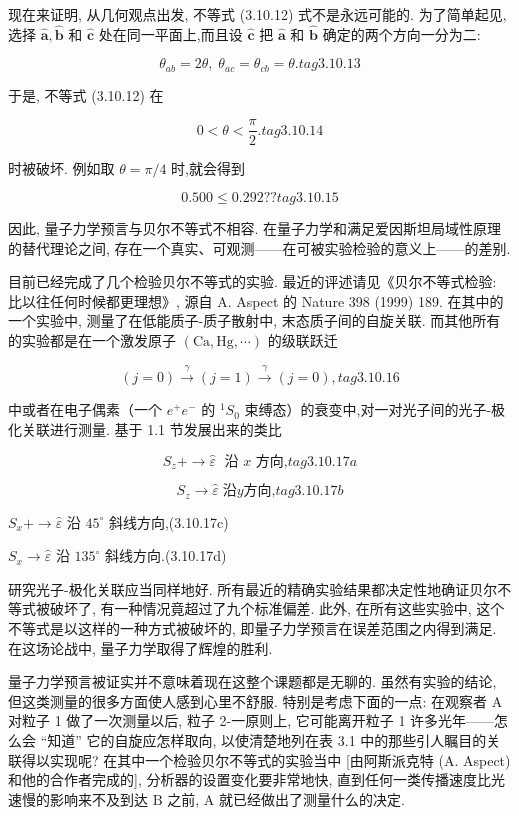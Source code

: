 现在来证明, 从几何观点出发, 不等式 (3.10.12) 式不是永远可能的. 为了简单起见, 选择 $\widehat{\mathbf{a}},\widehat{\mathbf{b}}$ 和 $\widehat{\mathbf{c}}$ 处在同一平面上,而且设 $\widehat{\mathbf{c}}$ 把 $\widehat{\mathbf{a}}$ 和 $\widehat{\mathbf{b}}$ 确定的两个方向一分为二:

$$
{\theta }_{ab} = {2\theta },\;{\theta }_{ac} = {\theta }_{cb} = \theta . tag{3.10.13}
$$

于是, 不等式 (3.10.12) 在

$$
0 < \theta < \frac{\pi }{2}. tag{3.10.14}
$$

时被破坏. 例如取 $\theta = \pi /4$ 时,就会得到

$$
{0.500} \leq {0.292}?? tag{3.10.15}
$$

因此, 量子力学预言与贝尔不等式不相容. 在量子力学和满足爱因斯坦局域性原理的替代理论之间, 存在一个真实、可观测——在可被实验检验的意义上——的差别.

目前已经完成了几个检验贝尔不等式的实验. 最近的评述请见《贝尔不等式检验: 比以往任何时候都更理想》, 源自 A. Aspect 的 Nature 398 (1999) 189. 在其中的一个实验中, 测量了在低能质子-质子散射中, 末态质子间的自旋关联. 而其他所有的实验都是在一个激发原子 $\left( {\mathrm{{Ca}},\mathrm{{Hg}},\cdots }\right)$ 的级联跃迁

$$
\left( {j = 0}\right) \overset{\gamma }{ \rightarrow }\left( {j = 1}\right) \overset{\gamma }{ \rightarrow }\left( {j = 0}\right) , tag{3.10.16}
$$

中或者在电子偶素（一个 ${e}^{ + }{e}^{ - }$ 的 ${}^{1}{S}_{0}$ 束缚态）的衰变中,对一对光子间的光子-极化关联进行测量. 基于 1.1 节发展出来的类比

$$
{S}_{z} + \rightarrow \widehat{\varepsilon }\;\text{ 沿 }x\text{ 方向,} tag{3.10.17a}
$$

$$
{S}_{z} \rightarrow \widehat{\varepsilon }\;\text{沿}y\text{方向,} tag{3.10.17b}
$$

${S}_{x} + \rightarrow \widehat{\varepsilon }$ 沿 ${45}^{ \circ }$ 斜线方向,(3.10.17c)

${S}_{x} \rightarrow \widehat{\varepsilon }$ 沿 ${135}^{ \circ }$ 斜线方向.(3.10.17d)

研究光子-极化关联应当同样地好. 所有最近的精确实验结果都决定性地确证贝尔不等式被破坏了, 有一种情况竟超过了九个标准偏差. 此外, 在所有这些实验中, 这个不等式是以这样的一种方式被破坏的, 即量子力学预言在误差范围之内得到满足. 在这场论战中, 量子力学取得了辉煌的胜利.

量子力学预言被证实并不意味着现在这整个课题都是无聊的. 虽然有实验的结论, 但这类测量的很多方面使人感到心里不舒服. 特别是考虑下面的一点: 在观察者 $\mathrm{A}$ 对粒子 1 做了一次测量以后, 粒子 2-一原则上, 它可能离开粒子 1 许多光年——怎么会 “知道” 它的自旋应怎样取向, 以使清楚地列在表 3.1 中的那些引人瞩目的关联得以实现呢? 在其中一个检验贝尔不等式的实验当中 [由阿斯派克特 (A. Aspect) 和他的合作者完成的], 分析器的设置变化要非常地快, 直到任何一类传播速度比光速慢的影响来不及到达 $\mathrm{B}$ 之前, A 就已经做出了测量什么的决定.

